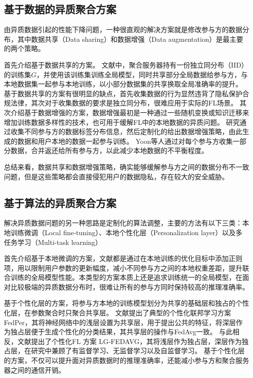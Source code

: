 \subsection{基于数据的异质聚合方案}
由异质数据引起的性能下降问题，一种很直观的解决方案就是修改参与方的数据分布，其中数据共享（Data sharing）和数据增强（Data augmentation）\cite{tanner1987calculation}是最主要的两个策略。

首先介绍基于数据共享的方案\cite{zhao2018federated, yoshida2020hybrid, tuor2021overcoming}。
文献\cite{zhao2018federated}中，聚合服务器持有一份独立同分布（IID）的训练集$G$，并使用该训练集训练全局模型，同时共享部分全局数据给参与方，与本地数据集一起参与本地训练，以小部分数据集的共享换取全局准确率的提升。
基于数据共享的方案有很明显的缺点，首先收集数据的行为显然违背了隐私保护合规法律，其次对于收集数据的要求是独立同分布，很难应用于实际的FL场景。
其次介绍基于数据增强的方案\cite{duan2019astraea, shin2020xor, yoonfedmix}，数据增强\cite{tanner1987calculation}最初是一种通过一些随机变换或知识迁移来增加训练数据多样性的技术，也可用于缓解FL中的本地数据的异质问题。
研究\cite{duan2019astraea}通过收集不同参与方的数据标签分布信息，然后定制化的给出数据增强策略，由此生成的数据和用户本地的数据一起参与训练。
Yoon等人\cite{yoonfedmix}通过对每个参与方收集一部分数据，合并返还给所有参与方，以此减少本地数据的不平衡程度。

总结来看，数据共享和数据增强策略，确实能够缓解参与方之间的数据分布不一致问题，但是这些策略都会直接侵犯用户的数据隐私，存在较大的安全威胁。

\subsection{基于算法的异质聚合方案}
解决异质数据问题的另一种思路是定制化的算法调整，主要的方法有以下三类：本地训练微调（Local fine-tuning）\cite{hanzely2020federated, t2020personalized, huang2021personalized}、本地个性化层（Personalization layer）以及多任务学习（Multi-task learning）

首先介绍基于本地微调的方案，文献\cite{li2020federated, hanzely2020federated, t2020personalized, huang2021personalized}都是通过在本地训练的优化目标中添加正则项，用以限制用户参数的更新幅度，减小不同参与方之间的本地权重差距，提升联合训练的全局模型性能。本类型的方案本质上还是追求训练统一的全局模型，在面对比较极端的异质数据分布时，很难让所有的参与方同时保持较高的推理准确率。

基于个性化层的方案，将参与方本地的训练模型划分为共享的基础层和独占的个性化层，在参数聚合时只聚合共享层。
文献\cite{arivazhagan2019federated}提出了典型的个性化联邦学习方案FedPer，其将神经网络中的浅层设置为共享层，用于提出公共的特征，将深层作为独占层便于生成个性化的分类结果，其共享层的操作与FedAvg一致。
与此相反，文献\cite{liang2020think}提出了个性化FL
方案 LG-FEDAVG，其将浅层作为独占层，深层作为独占层，在研究中兼顾了有监督学习、无监督学习以及自监督学习。
基于个性化层的方案，不仅可以提升面对异质数据时的推理准确率，还能减小参与方和聚合服务器之间的通信开销。

